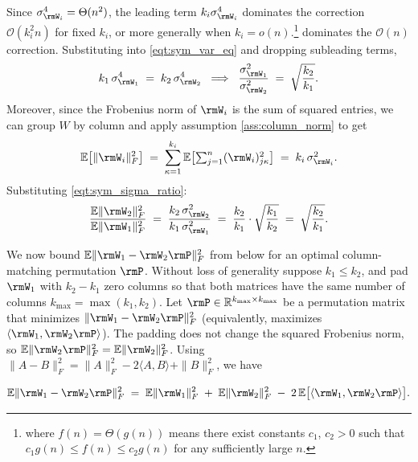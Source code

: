 \documentclass{article}
\begin{document}
Since $\sigma_{\rmW_i}^4 = \Theta(n^2)$, the leading term $k_i\sigma_{\rmW_i}^4$ dominates the correction $\mathcal{O}(k_i^2 n)$ for fixed $k_i$, or more generally when $k_i=o(n)$.\footnote{where $f(n) = \Theta(g(n))$ means there exist constants $c_1$, $c_2 > 0$ such that $c_1 g(n) \leq f(n) \leq c_2 g(n)$ for any sufficiently large $n$.} dominates the $\mathcal{O}(n)$ correction. Substituting into \eqref{eqt:sym_var_eq} and dropping subleading terms,
\begin{equation}
k_1\,\sigma_{\rmW_1}^4 \;=\; k_2\,\sigma_{\rmW_2}^4
\;\;\Longrightarrow\;\;
\frac{\sigma_{\rmW_1}^2}{\sigma_{\rmW_2}^2} \;=\; \sqrt{\frac{k_2}{k_1}}.
\label{eqt:sym_sigma_ratio}
\end{equation}
Moreover, since the Frobenius norm of $\rmW_i$ is the sum of squared entries, we can group $W$ by column and apply assumption \eqref{ass:column_norm} to get
\begin{equation}
\mathbb{E}\bigl[\|\rmW_i\|_F^2\bigr]
\;=\; \sum_{\kappa = 1}^{k_i} \mathbb{E}\bigl[\textstyle\sum_{j=1}^n (\rmW_i)_{j\kappa}^2\bigr]
\;=\; k_i\, \sigma_{\rmW_i}^2.
\end{equation}
Substituting \eqref{eqt:sym_sigma_ratio}:
\begin{equation}
\frac{\mathbb{E}\|\rmW_2\|_F^2}{\mathbb{E}\|\rmW_1\|_F^2}
\;=\; \frac{k_2\, \sigma_{\rmW_2}^2}{k_1\, \sigma_{\rmW_1}^2}
\;=\; \frac{k_2}{k_1} \cdot \sqrt{\frac{k_1}{k_2}}
\;=\; \sqrt{\frac{k_2}{k_1}}.
\label{eqt:sym_frob_ratio}
\end{equation}

We now bound $\mathbb{E}\|\rmW_1 - \rmW_2 \rmP\|_F^2$ from below for an optimal column-matching permutation $\rmP$. Without loss of generality suppose $k_1 \leq k_2$, and pad $\rmW_1$ with $k_2 - k_1$ zero columns so that both matrices have the same number of columns $k_{\max} = \max(k_1, k_2)$. Let $\rmP \in \mathbb{R}^{k_{\max} \times k_{\max}}$ be a permutation matrix that minimizes $\|\rmW_1 - \rmW_2 \rmP\|_F^2$ (equivalently, maximizes $\langle \rmW_1, \rmW_2 \rmP \rangle$). The padding does not change the squared Frobenius norm, so $\mathbb{E}\|\rmW_2 \rmP\|_F^2 = \mathbb{E}\|\rmW_2\|_F^2$. Using $\|A - B\|_F^2 = \|A\|_F^2 - 2\langle A, B \rangle + \|B\|_F^2$, we have

\begin{equation}
\mathbb{E}\|\rmW_1 - \rmW_2 \rmP\|_F^2
\;=\; \mathbb{E}\|\rmW_1\|_F^2 \;+\; \mathbb{E}\|\rmW_2\|_F^2
\;-\; 2\,\mathbb{E}\bigl[\langle \rmW_1, \rmW_2 \rmP \rangle\bigr].
\label{eqt:sym_dist_expansion}
\end{equation}
\end{document}
